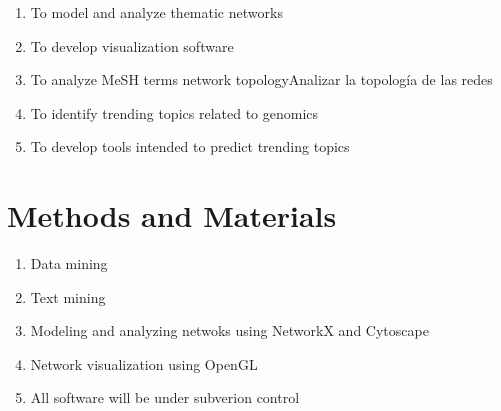 \documentclass[letterpaper,12pt]{article}
\begin{document}
\begin{enumerate}

\item{To model and analyze thematic networks}%

\item{To develop visualization software}%

\item{To analyze MeSH terms network topology}{Analizar la topología de las redes}

\item{To identify trending topics related to genomics}%

\item{To develop tools intended to predict trending topics}%


\end{enumerate}

\section{Methods and Materials}%


\begin{enumerate}

\item{Data mining}

\item{Text mining}

\item{Modeling and analyzing netwoks using NetworkX and Cytoscape}

\item{Network visualization using OpenGL}

\item{All software will be under subverion control}

\end{enumerate}
\end{document}
